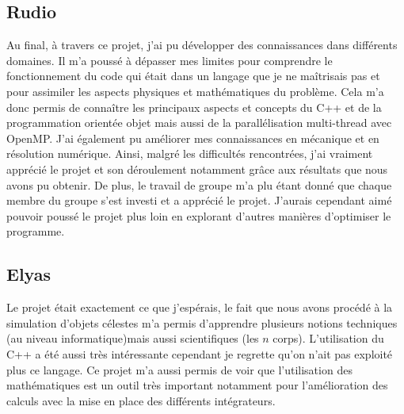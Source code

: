 \subsection{Rudio}


Au final, à travers ce projet, j'ai pu développer des connaissances dans différents domaines. Il m'a poussé à dépasser mes limites pour comprendre le fonctionnement du code qui était dans un langage que je ne maîtrisais pas et pour assimiler les aspects physiques et mathématiques du problème.
Cela m'a donc permis de connaître les principaux aspects et concepts du C++ et de la programmation orientée objet mais aussi de la parallélisation multi-thread avec OpenMP. J'ai également pu améliorer mes connaissances en mécanique et en résolution numérique. 
Ainsi, malgré les difficultés rencontrées, j'ai vraiment apprécié le projet et son déroulement notamment grâce aux résultats que nous avons pu obtenir. De plus, le travail de groupe m'a plu étant donné que chaque membre du groupe s'est investi et a apprécié le projet.
J'aurais cependant aimé pouvoir poussé le projet plus loin en explorant d'autres manières d'optimiser le programme.


\subsection{Elyas}


Le projet était exactement ce que j'espérais, le fait que nous avons procédé à la simulation d'objets célestes m'a permis d'apprendre plusieurs notions techniques (au niveau informatique)mais aussi scientifiques (les $n$ corps). L'utilisation du C++ a été aussi très intéressante cependant je regrette qu'on n'ait pas exploité plus ce langage. Ce projet m'a aussi permis de voir que l'utilisation des mathématiques est un outil très important notamment pour l'amélioration des calculs avec la mise en place des différents intégrateurs.


